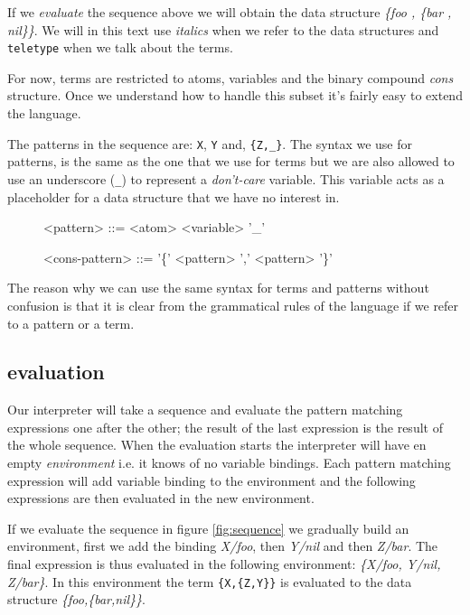 \documentclass[a4paper,11pt]{article}
\begin{document}
If we {\em evaluate} the sequence above we will obtain the data
structure \textit{ \{foo , \{bar , nil\}\}}. We will in this
text use {\it italics} when we refer to the data structures and
\verb+teletype+ when we talk about the terms.

For now, terms are restricted to atoms, variables and the binary
compound {\em cons} structure. Once we understand how to handle this
subset it's fairly easy to extend the language.

The patterns in the sequence are: \verb+X+, \verb+Y+ and,
\verb+{Z,_}+. The syntax we use for patterns, is the same as the one
that we use for terms but we are also allowed to use an underscore
(\verb+_+) to represent a {\em don't-care} variable. This variable
acts as a placeholder for a data structure that we have no interest
in.

\begin{figure}[h]
\begin{grammar}

<pattern> ::= <atom>
\alt <variable>
\alt '_'  

<cons-pattern> ::= '\{' <pattern> ',' <pattern> '\}'
\end{grammar}
\end{figure}

The reason why we can use the same syntax for terms and patterns
without confusion is that it is clear from the grammatical rules of the
language if we refer to a pattern or a term. 

\subsection{evaluation}

Our interpreter will take a sequence and evaluate the pattern matching expressions one
after the other; the result of the last expression is the result of
the whole sequence. When the evaluation starts the interpreter will
have en empty {\em environment} i.e. it knows of no variable
bindings. Each pattern matching expression will add variable binding
to the environment and the following expressions are then evaluated in
the new environment.
 
If we evaluate the sequence in figure \ref{fig:sequence} we gradually
build an environment, first we add the binding {\em X/foo}, then {\em
  Y/nil} and then {\em Z/bar}. The final expression is thus evaluated
in the following environment: {\em \{X/foo, Y/nil, Z/bar\}}. In this
environment the term \verb+{X,{Z,Y}}+ is evaluated to the data
structure {\em \{foo,\{bar,nil\}\}}.
\end{document}
